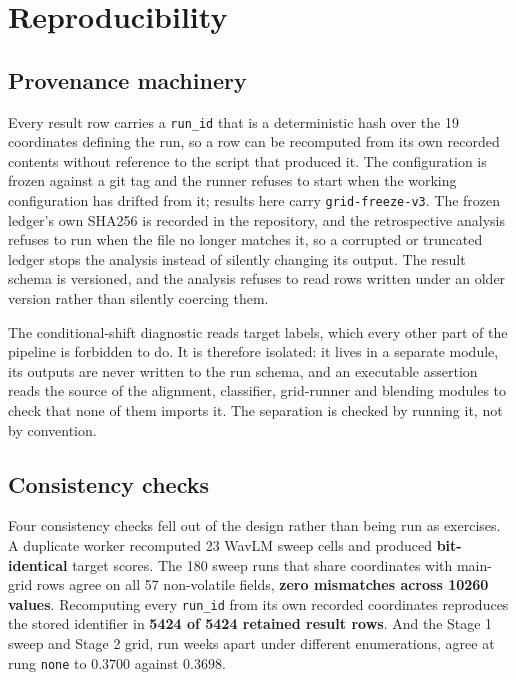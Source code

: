\section{Reproducibility}
\label{sec:reproducibility}

\subsection{Provenance machinery}
\label{sec:repro-provenance}

Every result row carries a \texttt{run\_id} that is a deterministic hash over
the 19 coordinates defining the run, so a row can be recomputed from its own
recorded contents without reference to the script that produced it. The
configuration is frozen against a git tag and the runner refuses to start when
the working configuration has drifted from it; results here carry
\texttt{grid-freeze-v3}. The frozen ledger's own SHA256 is recorded in the
repository, and the retrospective analysis refuses to run when the file no
longer matches it, so a corrupted or truncated ledger stops the analysis
instead of silently changing its output. The result schema is versioned, and
the analysis refuses to read rows written under an older version rather than
silently coercing them.

The conditional-shift diagnostic reads target labels, which every other part of
the pipeline is forbidden to do. It is therefore isolated: it lives in a
separate module, its outputs are never written to the run schema, and an
executable assertion reads the source of the alignment, classifier, grid-runner
and blending modules to check that none of them imports it. The separation is
checked by running it, not by convention.

\subsection{Consistency checks}
\label{sec:repro-checks}

Four consistency checks fell out of the design rather than being run as
exercises. A duplicate worker recomputed 23 WavLM sweep cells and produced
\textbf{bit-identical} target scores. The 180 sweep runs that share coordinates
with main-grid rows agree on all 57 non-volatile fields, \textbf{zero mismatches
across 10260 values}. Recomputing every \texttt{run\_id} from its own recorded
coordinates reproduces the stored identifier in \textbf{5424 of 5424 retained
result rows}.
And the Stage 1 sweep and Stage 2 grid, run weeks apart under different
enumerations, agree at rung \texttt{none} to $0.3700$ against $0.3698$.

